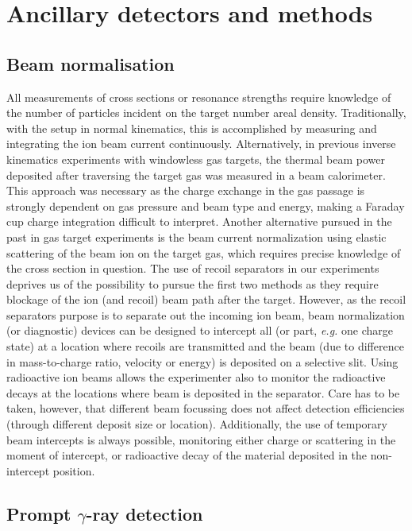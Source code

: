 \section{Ancillary detectors and methods}

\subsection{Beam normalisation}

All measurements of cross sections or resonance strengths require knowledge of the number of particles incident on the target number areal density. Traditionally, with the setup in normal kinematics, this is accomplished by measuring and integrating the ion beam current continuously. Alternatively, in previous inverse kinematics experiments with windowless gas targets, the thermal beam power deposited after traversing the target gas was measured in a beam calorimeter. This approach was necessary as the charge exchange in the gas passage is strongly dependent on gas pressure and beam type and energy, making a Faraday cup charge integration difficult to interpret. Another alternative pursued in the past in gas target experiments is the beam current normalization using elastic scattering of the beam ion on the target gas, which requires precise knowledge of the cross section in question. The use of recoil separators in our experiments deprives us of the possibility to pursue the first two methods as they require blockage of the ion (and recoil) beam path after the target. However, as the recoil separators purpose is to separate out the incoming ion beam, beam normalization (or diagnostic) devices can be designed to intercept all (or part, {\it e.g.} one charge state) at a location where recoils are transmitted and the beam (due to difference in mass-to-charge ratio, velocity or energy) is deposited on a selective slit. Using radioactive ion beams allows the experimenter also to monitor the radioactive decays at the locations where beam is deposited in the separator. Care has to be taken, however, that different beam focussing does not affect detection efficiencies (through different deposit size or location). Additionally, the use of temporary beam intercepts is always possible, monitoring either charge or scattering in the moment of intercept, or radioactive decay of the material deposited in the non-intercept position.

\subsection{Prompt $\gamma$-ray detection}

